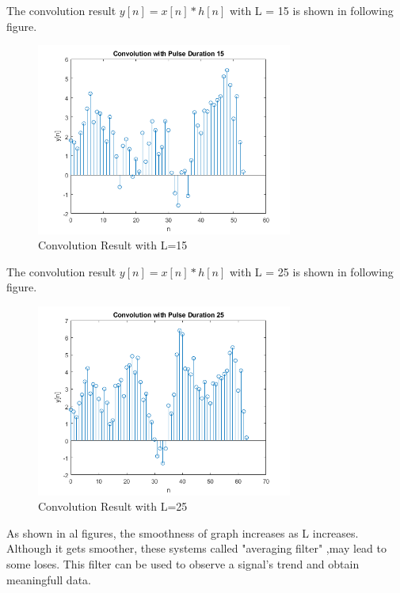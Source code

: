 \documentclass[letterpaper,12pt]{article}
\begin{document}
    The convolution result \(y[n] = x[n] * h[n]\) with L = 15 is shown in following figure.
    \begin{figure}[H]
        \centering
        \includegraphics[width = 0.75\textwidth]{b_duration15.png}
        \caption{Convolution Result with L=15}
        \end{figure} 

        
        The convolution result \(y[n] = x[n] * h[n]\) with L = 25 is shown in following figure. 
        \begin{figure}[H]
            \centering
            \includegraphics[width = 0.75\textwidth]{b_duration25.png}
            \caption{Convolution Result with L=25}
            \end{figure} 



As shown in al figures, the smoothness of graph increases as L increases. Although it gets smoother, these systems called "averaging filter" ,may lead to some loses. This filter can be used to observe a signal's trend and obtain meaningfull data.
\end{document}
